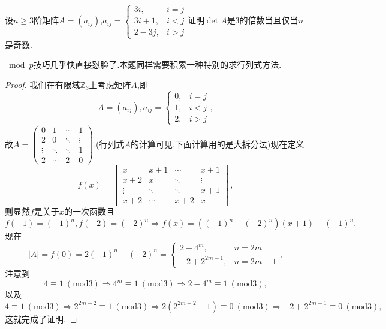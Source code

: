 \documentclass[../../main.tex]{subfiles}
\begin{document}
\begin{example}
设\( n \geqslant 3 \)阶矩阵\( A = (a_{ij}) \),\( a_{ij} = \begin{cases}
3i, & i = j \\
3i + 1, & i < j \\
2 - 3j, & i > j
\end{cases} \)证明\( \det A \)是3的倍数当且仅当\( n \)是奇数.
\end{example}
\begin{note}
\(\bmod p\)技巧几乎快直接怼脸了.本题同样需要积累一种特别的求行列式方法.
\end{note}
\begin{proof}
我们在有限域\( \mathbb{Z}_3 \)上考虑矩阵\( A \),即
\[
A = (a_{ij}),a_{ij} = \begin{cases}
0, & i = j \\
1, & i < j \\
2, & i > j
\end{cases},
\]
故\( A = \begin{pmatrix}
0 & 1 & \cdots & 1 \\
2 & 0 & \ddots & \vdots \\
\vdots & \ddots & \ddots & 1 \\
2 & \cdots & 2 & 0
\end{pmatrix} \).(行列式$A$的计算可见,下面计算用的是大拆分法)现在定义
\[
f(x) = \begin{vmatrix}
x & x + 1 & \cdots & x + 1 \\
x + 2 & x & \ddots & \vdots \\
\vdots & \ddots & \ddots & x + 1 \\
x + 2 & \cdots & x + 2 & x
\end{vmatrix},
\]
则显然\( f \)是关于\( x \)的一次函数且
\[
f(-1) = (-1)^n,f(-2) = (-2)^n \Rightarrow f(x) = ((-1)^n - (-2)^n)(x + 1) + (-1)^n.
\]
现在
\[
|A| = f(0) = 2(-1)^n - (-2)^n = \begin{cases}
2 - 4^m, & n = 2m \\
-2 + 2^{2m - 1}, & n = 2m - 1
\end{cases},
\]
注意到
\[
4 \equiv 1\ (\text{mod}3) \Rightarrow 4^m \equiv 1\ (\text{mod}3) \Rightarrow 2 - 4^m \equiv 1\ (\text{mod}3),
\]
以及
\[
4 \equiv 1\ (\text{mod}3) \Rightarrow 2^{2m - 2} \equiv 1\ (\text{mod}3) \Rightarrow 2(2^{2m - 2} - 1) \equiv 0\ (\text{mod}3) \Rightarrow -2 + 2^{2m - 1} \equiv 0\ (\text{mod}3),
\]
这就完成了证明.
\end{proof}
\end{document}
